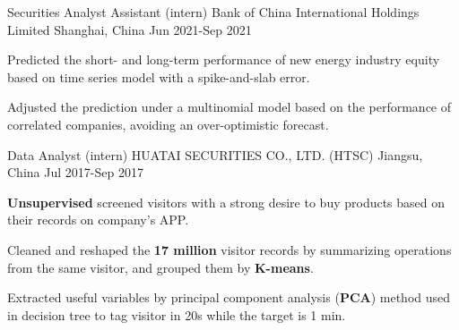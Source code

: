 \begin{cventries}
  \cventry
    {Securities Analyst Assistant (intern)} %
    {Bank of China International Holdings Limited} %
    {Shanghai, China} %
    {Jun 2021-Sep 2021} %
    {
      \begin{cvitems} %
        \item {Predicted the short- and long-term performance of new energy industry equity based on time series model with a spike-and-slab error.}
        \item {Adjusted the prediction under a multinomial model based on the performance of correlated companies, avoiding an over-optimistic forecast.}
      \end{cvitems}
    }

  \cventry
    {Data Analyst (intern)} %
    {HUATAI SECURITIES CO., LTD. (HTSC)} %
    {Jiangsu, China} %
    {Jul 2017-Sep 2017} %
    {
      \begin{cvitems} %
        \item {\textbf{Unsupervised} screened visitors with a strong desire to buy products based on their records on company’s APP.}
        \item {Cleaned and reshaped the \textbf{17 million} visitor records by summarizing operations from the same visitor, and grouped them by \textbf{K-means}.}
        \item {Extracted useful variables by principal component analysis (\textbf{PCA}) method used in decision tree to tag visitor in 20s while the target is 1 min.}
      \end{cvitems}
    }



\end{cventries}
